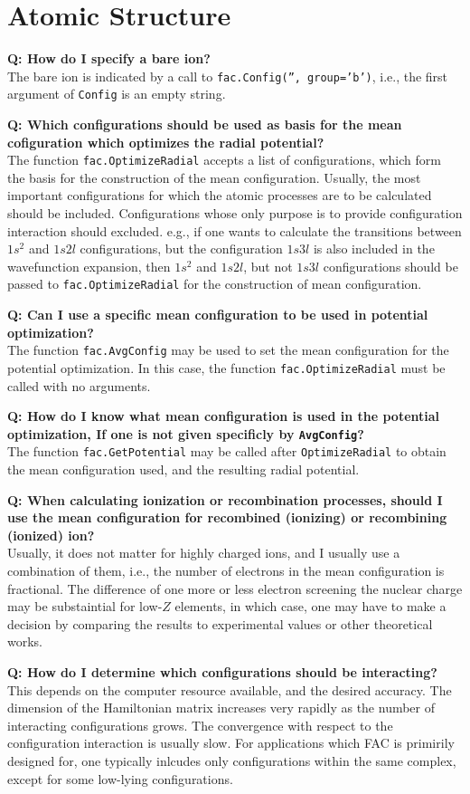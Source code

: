 \documentclass[twoside,letterpaper]{refrep}
\newcommand{\key}[1]{\texttt{#1}}
\newcounter{faq}[section]
\newcommand{\faq}[2]{\stepcounter{faq}
	\begin{minipage}{\textwidth}
	\textbf{Q\arabic{faq}: #1?}\\#2
	\end{minipage}}
\begin{document}
\section{Atomic Structure}
\faq{How do I specify a bare ion}{
The bare ion is indicated by a call to \key{fac.Config('', group='b')}, i.e.,
the first argument of \key{Config} is an empty string.}

\faq{Which configurations should be used as basis for the mean cofiguration
which optimizes the radial potential}{
The function \key{fac.OptimizeRadial} accepts a list of configurations, which
form the basis for the construction of the mean configuration. Usually, the
most important configurations for which the atomic processes are to be
calculated should be included. Configurations whose only purpose is to provide
configuration interaction should excluded. e.g., if one wants to calculate the
transitions between $1s^2$ and $1s2l$ configurations, but the configuration
$1s 3l$ is also included in the wavefunction expansion, then $1s^2$ and
$1s2l$, but not $1s 3l$ configurations should be passed to
\key{fac.OptimizeRadial} for the construction of mean configuration.}

\faq{Can I use a specific mean configuration to be used in potential
optimization}{
The function \key{fac.AvgConfig} may be used to set the mean configuration for
the potential optimization. In this case, the function
\key{fac.OptimizeRadial} must be called with no arguments.}

\faq{How do I know what mean configuration is used in the potential
optimization, If one is not given specificly by \key{AvgConfig}}{
The function \key{fac.GetPotential} may be called after \key{OptimizeRadial}
to obtain the mean configuration used, and the resulting radial potential.}

\faq{When calculating ionization or recombination processes, should I use the
mean configuration for recombined (ionizing) or recombining (ionized) ion}{
Usually, it does not matter for highly charged ions, and I usually use a
combination of them, i.e., the number of electrons in the mean configuration
is fractional. The difference of one more or less electron screening the
nuclear charge may be substaintial for low-$Z$ elements, in which case, one
may have to make a decision by comparing the results to experimental values or
other theoretical works.}

\faq{How do I determine which configurations should be interacting}{
This depends on the computer resource available, and the desired accuracy. The
dimension of the Hamiltonian matrix increases very rapidly as the number of
interacting configurations grows. The convergence with respect to the
configuration interaction is usually slow. For applications which FAC is
primirily designed for, one typically inlcudes only configurations within the
same complex, except for some low-lying configurations.}
\end{document}

